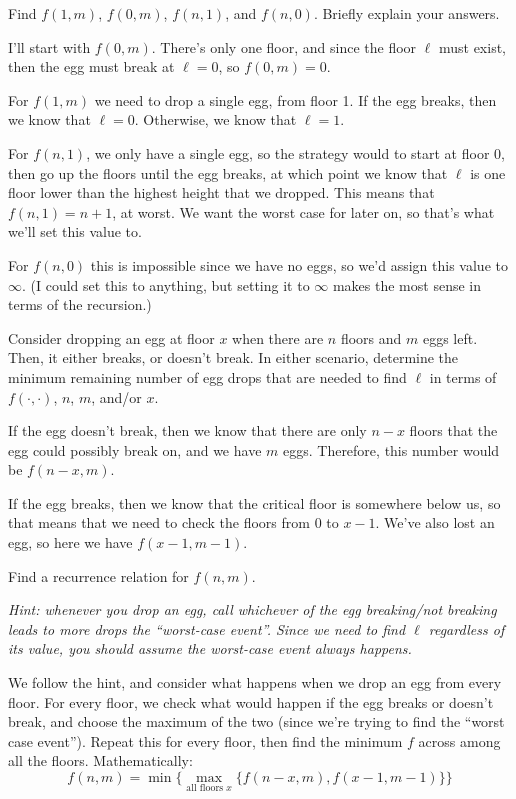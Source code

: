 \documentclass[11pt]{article}
\begin{document}
\begin{subparts}
\subpart Find $f(1,m)$, $f(0, m)$, $f(n,1)$, and $f(n,0)$. Briefly explain your answers.

\begin{solution}
	I'll start with $f(0, m)$. There's only one floor, and since the floor $\ell$ must exist, then 
	the egg must break at $\ell = 0$, so $f(0, m) = 0$. 

	For $f(1, m)$ we need to drop a single egg, from floor 1. If the egg breaks, then we know that 
	$\ell = 0$. Otherwise, we know that $\ell = 1$. 

	For $f(n, 1)$, we only have a single egg, so the strategy would to start at floor 0, then go up 
	the floors until the egg breaks, at which point we know that $\ell$ is one floor lower than 
	the highest height that we dropped. This means that $f(n, 1) = n+1$, at worst. We want the worst case 
	for later on, so that's what we'll set this value to. 

	For $f(n, 0)$ this is impossible since we have no eggs, so we'd assign this value to $\infty$. (I could set 
	this to anything, but setting it to \( \infty \) makes the most sense in terms of the recursion.) 
\end{solution}

\subpart Consider dropping an egg at floor $x$ when there are $n$ floors and $m$ eggs left. Then, it either breaks, or doesn't break. In either scenario, determine the minimum remaining number of egg drops that are needed to find $\ell$ in terms of $f(\cdot, \cdot)$, $n$, $m$, and/or $x$.

\begin{solution}
	If the egg doesn't break, then we know that there are only $n - x$ floors that the egg could possibly 
	break on, and we have $m$ eggs. Therefore, this number would be $f(n-x,m)$. 

	If the egg breaks, then we know that the critical floor is somewhere below us, so that means that we need 
	to check the floors from 0 to $x-1$. We've also lost an egg, so here we have $f(x-1, m-1)$. 
\end{solution}
\subpart Find a recurrence relation for $f(n,m)$. 

\emph{Hint: whenever you drop an egg, call whichever of the egg breaking/not breaking leads to more drops the ``worst-case event''. Since we need to find $\ell$ regardless of its value, you should assume the worst-case event always happens.}

\begin{solution}
	We follow the hint, and consider what happens when we drop an egg from every floor. For every floor, 
	we check what would happen if the egg breaks or doesn't break, and choose the maximum of the two (since 
	we're trying to find the ``worst case event''). Repeat this for every floor, then find the minimum $f$ across
	among all the floors. Mathematically:
	\[
		f(n, m) = \min\{\max_{\text{all floors $x$}} \{f(n - x, m), f(x-1, m-1)\}\}
	\]
\end{solution}


\end{subparts}
\end{document}
